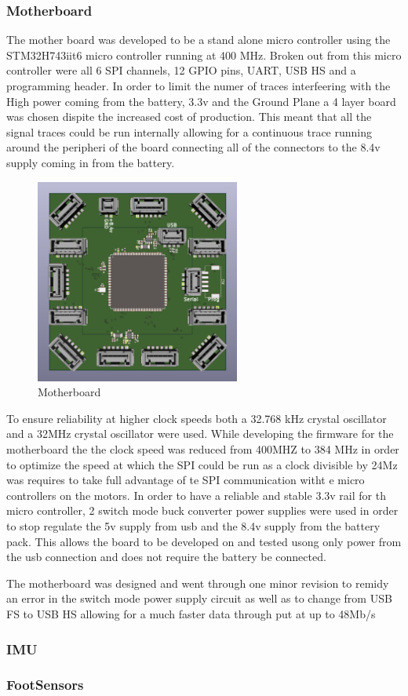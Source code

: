 \subsubsection{Motherboard}
The mother board was developed to be a stand alone micro controller using the STM32H743iit6 micro controller running at 400 MHz. Broken out from this micro controller were all 6 SPI channels, 12 GPIO pins, UART, USB HS and a programming header. In order to limit the numer of traces interfeering with the High power  coming from the battery, 3.3v and the Ground Plane a 4 layer board was chosen dispite the increased cost of production. This meant that all the signal traces could be run internally allowing for a continuous trace running around the peripheri of the board connecting all of the connectors to the 8.4v supply coming in from the battery.
\begin{figure}[H]
       \centering
       \includegraphics[width=0.6\textwidth]{figures/Motherboard.png}
       \caption{Motherboard}
       \label{fig:my_label}
   \end{figure}
To ensure reliability at higher clock speeds both a 32.768 kHz crystal oscillator and a 32MHz crystal oscillator were used. While developing the firmware for the motherboard the the clock speed was reduced from 400MHZ to 384 MHz in order to optimize the speed at which the SPI could be run as a clock divisible by 24Mz was requires to take full advantage of te SPI communication witht e micro controllers on the motors. In order to have a reliable and stable 3.3v rail for th micro controller, 2 switch mode buck converter power supplies were used in order to stop regulate the 5v supply from usb and the 8.4v supply from the battery pack. This allows the board to be developed on and tested usong only power from the usb connection and does not require the battery be connected. 
  
   The motherboard was designed and went through one minor revision to remidy an error in the switch mode power supply circuit as well as to change from USB FS to USB HS allowing for a much faster data  through put at up to 48Mb/s
\subsubsection{IMU}

\subsubsection{FootSensors}